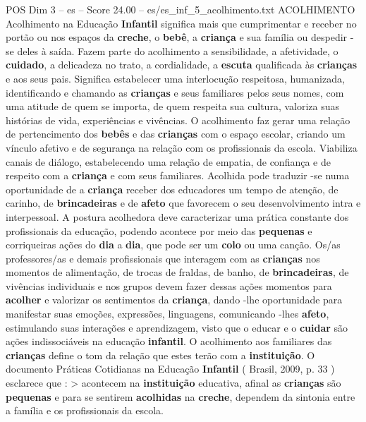 \begin{textsample}{POS Dim 3 – es – Score 24.00 – es/es\_inf\_5\_acolhimento.txt}  \label{ex:f3_pos_112}
ACOLHIMENTO Acolhimento na Educação \textbf{Infantil} significa mais que cumprimentar e receber no portão ou nos espaços da \textbf{creche}, o \textbf{bebê}, a \textbf{criança} e sua família ou despedir -se deles à saída.
Fazem parte do acolhimento a sensibilidade, a afetividade, o \textbf{cuidado}, a delicadeza no trato, a cordialidade, a \textbf{escuta} qualificada às \textbf{crianças} e aos seus pais.
Significa estabelecer uma interlocução respeitosa, humanizada, identificando e chamando as \textbf{crianças} e seus familiares pelos seus nomes, com uma atitude de quem se importa, de quem respeita sua cultura, valoriza suas histórias de vida, experiências e vivências.
O acolhimento faz gerar uma relação de pertencimento dos \textbf{bebês} e das \textbf{crianças} com o espaço escolar, criando um vínculo afetivo e de segurança na relação com os profissionais da escola.
Viabiliza canais de diálogo, estabelecendo uma relação de empatia, de confiança e de respeito com a \textbf{criança} e com seus familiares.
Acolhida pode traduzir -se numa oportunidade de a \textbf{criança} receber dos educadores um tempo de atenção, de carinho, de \textbf{brincadeiras} e de \textbf{afeto} que favorecem o seu desenvolvimento intra e interpessoal.
A postura acolhedora deve caracterizar uma prática constante dos profissionais da educação, podendo acontece por meio das \textbf{pequenas} e corriqueiras ações do \textbf{dia} a \textbf{dia}, que pode ser um \textbf{colo} ou uma canção.
Os/as professores/as e demais profissionais que interagem com as \textbf{crianças} nos momentos de alimentação, de trocas de fraldas, de banho, de \textbf{brincadeiras}, de vivências individuais e nos grupos devem fazer dessas ações momentos para \textbf{acolher} e valorizar os sentimentos da \textbf{criança}, dando -lhe oportunidade para manifestar suas emoções, expressões, linguagens, comunicando -lhes \textbf{afeto}, estimulando suas interações e aprendizagem, visto que o educar e o \textbf{cuidar} são ações indissociáveis na educação \textbf{infantil}.
O acolhimento aos familiares das \textbf{crianças} define o tom da relação que estes terão com a \textbf{instituição}.
O documento Práticas Cotidianas na Educação \textbf{Infantil} ( Brasil, 2009, p. 33 ) esclarece que : > acontecem na \textbf{instituição} educativa, afinal as \textbf{crianças} são \textbf{pequenas} e para se sentirem \textbf{acolhidas} na \textbf{creche}, dependem da sintonia entre a família e os profissionais da escola.

\end{textsample}
